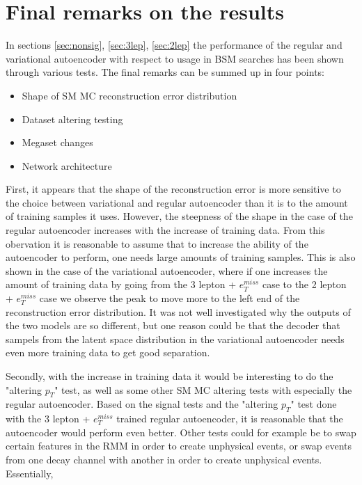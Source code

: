 \section{Final remarks on the results}
In sections \ref{sec:nonsig}, \ref{sec:3lep}, \ref{sec:2lep} the performance 
of the regular and variational autoencoder with respect to usage in BSM 
searches has been shown through various tests. The final remarks can be summed 
up in four points:
\begin{itemize}
    
    \item Shape of SM MC reconstruction error distribution 
    \item Dataset altering testing
    \item Megaset changes 
    \item Network architecture

\end{itemize}
First, it appears that the shape of the reconstruction error is more sensitive 
to the choice between variational and regular autoencoder than it is to the 
amount of training samples it uses. However, the steepness of the shape in the 
case of the regular autoencoder increases with the increase of training data. 
From this obervation it is reasonable to assume that to increase the ability of 
the autoencoder to perform, one needs large amounts of training samples. This 
is also shown in the case of the variational autoencoder, where if one increases 
the amount of training data by going from the 3 lepton + $e_T^{miss}$ case to 
the 2 lepton + $e_T^{miss}$ case we observe the peak to move more to the left 
end of the reconstruction error distribution. It was not well investigated 
why the outputs of the two models are so different, but one reason could be 
that the decoder that sampels from the latent space distribution in the 
variational autoencoder needs even more training data to get good separation. \par 
Secondly, with the increase in training data it would be interesting to do the 
"altering $p_T$" test, as well as some other SM MC altering tests with especially the 
regular autoencoder. Based on the signal tests and the "altering $p_T$" test done with 
the 3 lepton + $e_T^{miss}$ trained regular autoencoder, it is reasonable that the 
autoencoder would perform even better. Other tests could for example be to swap 
certain features in the RMM in order to create unphysical events, or swap events from
one decay channel with another in order to create unphysical events. Essentially, 

